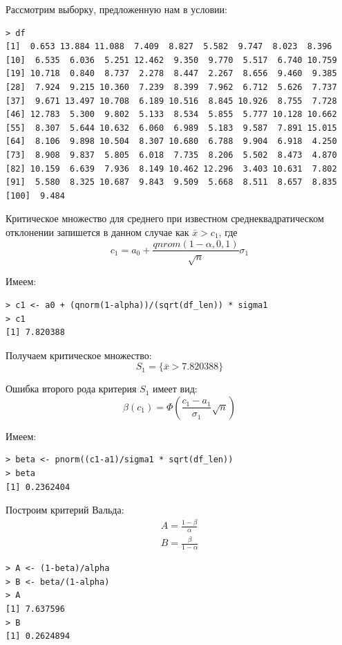 \documentclass[14pt,a4paper]{scrartcl}
\begin{document}
Рассмотрим выборку, предложенную нам в условии:
\begin{lstlisting}
> df
[1]  0.653 13.884 11.088  7.409  8.827  5.582  9.747  8.023  8.396
[10]  6.535  6.036  5.251 12.462  9.350  9.770  5.517  6.740 10.759
[19] 10.718  0.840  8.737  2.278  8.447  2.267  8.656  9.460  9.385
[28]  7.924  9.215 10.360  7.239  8.399  7.962  6.712  5.626  7.737
[37]  9.671 13.497 10.708  6.189 10.516  8.845 10.926  8.755  7.728
[46] 12.783  5.300  9.802  5.133  8.534  5.855  5.777 10.128 10.662
[55]  8.307  5.644 10.632  6.060  6.989  5.183  9.587  7.891 15.015
[64]  8.106  9.898 10.504  8.307 10.680  6.788  9.904  6.918  4.250
[73]  8.908  9.837  5.805  6.018  7.735  8.206  5.502  8.473  4.870
[82] 10.159  6.639  7.936  8.149 10.462 12.296  3.403 10.631  7.802
[91]  5.580  8.325 10.687  9.843  9.509  5.668  8.511  8.657  8.835
[100]  9.484
\end{lstlisting}

Критическое множество для среднего при известном среднеквадратическом отклонении запишется в данном случае как $\bar{x} > c_1$, где
\begin{equation*}
c_1 = a_0 + \frac{qnrom(1-\alpha,0,1)}{\sqrt{n}}\sigma_1
\end{equation*}

Имеем:
\begin{lstlisting}
> c1 <- a0 + (qnorm(1-alpha))/(sqrt(df_len)) * sigma1
> c1
[1] 7.820388
\end{lstlisting}

Получаем критическое множество:
\begin{equation*}
	S_1 = \{\bar{x} > 7.820388\}
\end{equation*}

Ошибка второго рода критерия $S_1$ имеет вид:
\begin{equation*}
\beta(c_1) = \Phi(\frac{c_1-a_1}{\sigma_1}\sqrt{n})
\end{equation*}

Имеем:
\begin{lstlisting}
> beta <- pnorm((c1-a1)/sigma1 * sqrt(df_len))
> beta
[1] 0.2362404
\end{lstlisting}

Построим критерий Вальда:
\begin{align*} 
	A = \frac{1-\beta}{\alpha}\\
	B = \frac{\beta}{1-\alpha}
\end{align*}

\begin{lstlisting}
> A <- (1-beta)/alpha
> B <- beta/(1-alpha)
> A
[1] 7.637596
> B
[1] 0.2624894
\end{lstlisting}
\end{document}
